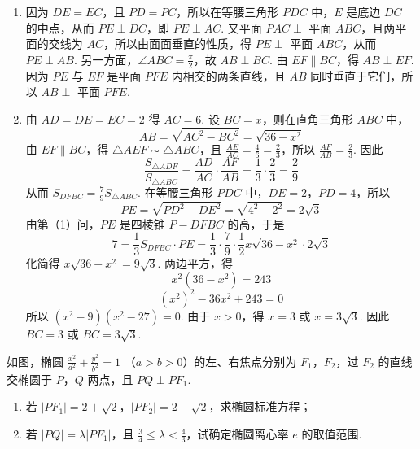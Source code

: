 \begin{solution}
\begin{enumerate}
\item 因为 \(DE=EC\)，且 \(PD=PC\)，所以在等腰三角形 \(PDC\) 中，\(E\) 是底边 \(DC\) 的中点，从而 \(PE\perp DC\)，即 \(PE\perp AC\). 又平面 \(PAC\perp\) 平面 \(ABC\)，且两平面的交线为 \(AC\)，所以由面面垂直的性质，得 \(PE\perp\) 平面 \(ABC\)，从而 \(PE\perp AB\). 另一方面，\(\angle ABC=\frac{\pi}{2}\)，故 \(AB\perp BC\). 由 \(EF\parallel BC\)，得 \(AB\perp EF\). 因为 \(PE\) 与 \(EF\) 是平面 \(PFE\) 内相交的两条直线，且 \(AB\) 同时垂直于它们，所以 \(AB\perp\) 平面 \(PFE\).
\item 由 \(AD=DE=EC=2\) 得 \(AC=6\). 设 \(BC=x\)，则在直角三角形 \(ABC\) 中，
\[
AB=\sqrt{AC^2-BC^2}=\sqrt{36-x^2}
\]
由 \(EF\parallel BC\)，得 \(\triangle AEF\sim\triangle ABC\)，且 \(\frac{AE}{AC}=\frac{4}{6}=\frac{2}{3}\)，所以 \(\frac{AF}{AB}=\frac{2}{3}\). 因此
\[
\frac{S_{\triangle ADF}}{S_{\triangle ABC}}=\frac{AD}{AC}\cdot\frac{AF}{AB}=\frac{1}{3}\cdot\frac{2}{3}=\frac{2}{9}
\]
从而 \(S_{DFBC}=\frac{7}{9}S_{\triangle ABC}\). 在等腰三角形 \(PDC\) 中，\(DE=2\)，\(PD=4\)，所以
\[
PE=\sqrt{PD^2-DE^2}=\sqrt{4^2-2^2}=2\sqrt{3}
\]
由第（1）问，\(PE\) 是四棱锥 \(P-DFBC\) 的高，于是
\[
7=\frac{1}{3}S_{DFBC}\cdot PE=\frac{1}{3}\cdot\frac{7}{9}\cdot\frac{1}{2}x\sqrt{36-x^2}\cdot2\sqrt{3}
\]
化简得 \(x\sqrt{36-x^2}=9\sqrt{3}\). 两边平方，得
\[
x^2(36-x^2)=243
\]
\[
(x^2)^2-36x^2+243=0
\]
所以 \((x^2-9)(x^2-27)=0\). 由于 \(x>0\)，得 \(x=3\) 或 \(x=3\sqrt{3}\). 因此 \(BC=3\) 或 \(BC=3\sqrt{3}\).
\end{enumerate}
\end{solution}

\begin{problem}
如图，椭圆 \(\frac{x^2}{a^2} + \frac{y^2}{b^2} = 1 \) （\(a > b > 0\)）的左、右焦点分别为 \(F_1\)，\(F_2\)，过 \(F_2\) 的直线交椭圆于 \(P\)，\(Q\) 两点，且 \(PQ \perp PF_1\).

\begin{enumerate}
\item 若 \(|PF_1| = 2 + \sqrt{2}\)，\(|PF_2| = 2 - \sqrt{2}\)，求椭圆标准方程；
\item 若 \(|PQ| = \lambda |PF_1|\)，且 \(\frac{3}{4} \leqslant \lambda < \frac{4}{3}\)，试确定椭圆离心率 \(e\) 的取值范围.
\end{enumerate}

\end{problem}

